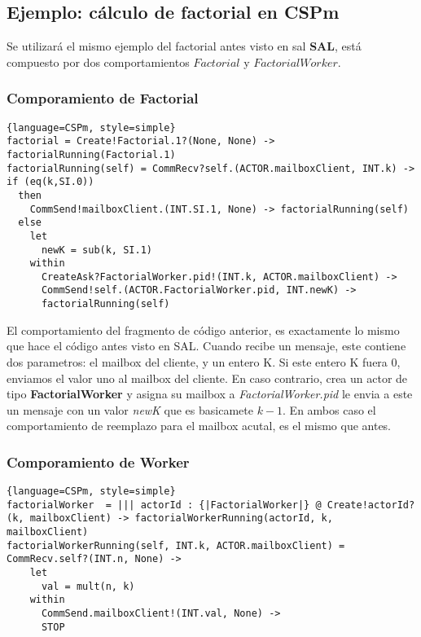 \documentclass[fleqn]{article}
\begin{document}
\subsection{Ejemplo: cálculo de factorial en CSPm}
Se utilizará el mismo ejemplo del factorial antes visto en sal \textbf{SAL},
está compuesto por dos comportamientos $Factorial$ y $FactorialWorker$.

\subsubsection*{Comporamiento de Factorial}

\begin{lstlisting}{language=CSPm, style=simple}
factorial = Create!Factorial.1?(None, None) -> factorialRunning(Factorial.1)
factorialRunning(self) = CommRecv?self.(ACTOR.mailboxClient, INT.k) ->
if (eq(k,SI.0))
  then
    CommSend!mailboxClient.(INT.SI.1, None) -> factorialRunning(self)
  else
    let
      newK = sub(k, SI.1)
    within
      CreateAsk?FactorialWorker.pid!(INT.k, ACTOR.mailboxClient) ->
      CommSend!self.(ACTOR.FactorialWorker.pid, INT.newK) ->
      factorialRunning(self)
\end{lstlisting}

El comportamiento del fragmento de código anterior, es exactamente lo mismo que
hace el código antes visto en SAL. Cuando recibe un mensaje, este contiene dos
parametros: el mailbox del cliente, y un entero K. Si este entero K fuera 0,
enviamos el valor uno al mailbox del cliente.
En caso contrario, crea un actor de tipo \textbf{FactorialWorker} y asigna su
mailbox a \textit{FactorialWorker.pid} le envia a este un mensaje con un valor
\textit{newK} que es basicamete $k-1$.
En ambos caso el comportamiento de reemplazo para el mailbox acutal, es el mismo
que antes.

\subsubsection*{Comporamiento de Worker}

\begin{lstlisting}{language=CSPm, style=simple}
factorialWorker  = ||| actorId : {|FactorialWorker|} @ Create!actorId?(k, mailboxClient) -> factorialWorkerRunning(actorId, k, mailboxClient)
factorialWorkerRunning(self, INT.k, ACTOR.mailboxClient) = CommRecv.self?(INT.n, None) ->
    let
      val = mult(n, k)
    within
      CommSend.mailboxClient!(INT.val, None) ->
      STOP
\end{lstlisting}
\end{document}
